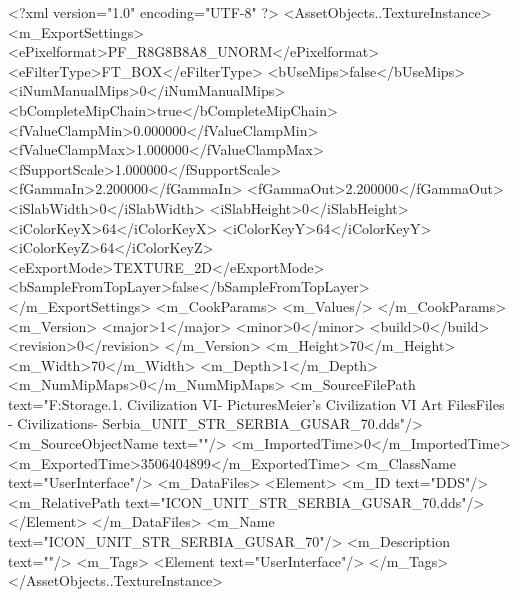 <?xml version="1.0" encoding="UTF-8" ?>
<AssetObjects..TextureInstance>
	<m_ExportSettings>
		<ePixelformat>PF_R8G8B8A8_UNORM</ePixelformat>
		<eFilterType>FT_BOX</eFilterType>
		<bUseMips>false</bUseMips>
		<iNumManualMips>0</iNumManualMips>
		<bCompleteMipChain>true</bCompleteMipChain>
		<fValueClampMin>0.000000</fValueClampMin>
		<fValueClampMax>1.000000</fValueClampMax>
		<fSupportScale>1.000000</fSupportScale>
		<fGammaIn>2.200000</fGammaIn>
		<fGammaOut>2.200000</fGammaOut>
		<iSlabWidth>0</iSlabWidth>
		<iSlabHeight>0</iSlabHeight>
		<iColorKeyX>64</iColorKeyX>
		<iColorKeyY>64</iColorKeyY>
		<iColorKeyZ>64</iColorKeyZ>
		<eExportMode>TEXTURE_2D</eExportMode>
		<bSampleFromTopLayer>false</bSampleFromTopLayer>
	</m_ExportSettings>
	<m_CookParams>
		<m_Values/>
	</m_CookParams>
	<m_Version>
		<major>1</major>
		<minor>0</minor>
		<build>0</build>
		<revision>0</revision>
	</m_Version>
	<m_Height>70</m_Height>
	<m_Width>70</m_Width>
	<m_Depth>1</m_Depth>
	<m_NumMipMaps>0</m_NumMipMaps>
	<m_SourceFilePath text="F:\Mod Storage\2.1. Civilization VI\Mods\Archive - Pictures\Sid Meier's Civilization VI Art Files\Art Files - Civilizations\Civilization - Serbia\ICON_UNIT_STR_SERBIA_GUSAR_70.dds"/>
	<m_SourceObjectName text=""/>
	<m_ImportedTime>0</m_ImportedTime>
	<m_ExportedTime>3506404899</m_ExportedTime>
	<m_ClassName text="UserInterface"/>
	<m_DataFiles>
		<Element>
			<m_ID text="DDS"/>
			<m_RelativePath text="ICON_UNIT_STR_SERBIA_GUSAR_70.dds"/>
		</Element>
	</m_DataFiles>
	<m_Name text="ICON_UNIT_STR_SERBIA_GUSAR_70"/>
	<m_Description text=""/>
	<m_Tags>
		<Element text="UserInterface"/>
	</m_Tags>
</AssetObjects..TextureInstance>

